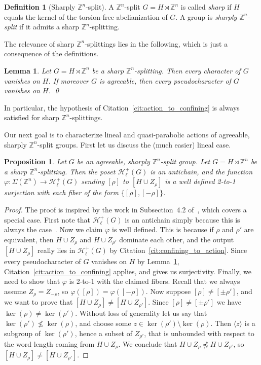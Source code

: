 \documentclass[10pt,a4paper]{article}
\newtheorem{prop}[cdrthm]{Proposition}
\newtheorem{lemm}[cdrthm]{Lemma}
\theoremstyle{definition}
\newtheorem{defi}[cdrthm]{Definition}
\theoremstyle{remark}
\newcommand{\Z}{\mathbb{Z}}
\newcommand{\Hyp}{\mathcal{H}}
\theoremstyle{plain}
\begin{document}
\begin{defi}[Sharply $\Z^n$-split]
    A $\Z^n$-split $G = H \rtimes \Z^n$ is called \emph{sharp} if $H$ equals the kernel of the torsion-free abelianization of $G$. A group is \emph{sharply $\Z^n$-split} if it admits a sharp $\Z^n$-splitting.
\end{defi}

The relevance of sharp $\Z^n$-splittings lies in the following, which is just a consequence of the definitions.

\begin{lemm}\label{lem:sharp}
Let $G = H \rtimes \Z^n$ be a sharp $\Z^n$-splitting. Then every character of $G$ vanishes on $H$. If moreover $G$ is agreeable, then every pseudocharacter of $G$ vanishes on $H$. \qed
\end{lemm}

In particular, the hypothesis of Citation~\ref{cit:action_to_confining} is always satisfied for sharp $\Z^n$-splittings.

Our next goal is to characterize lineal and quasi-parabolic actions of agreeable, sharply $\Z^n$-split groups. First let us discuss the (much easier) lineal case.

\begin{prop}\label{prop:lineal}
Let $G$ be an agreeable, sharply $\Z^n$-split group. Let $G=H\rtimes\Z^n$ be a sharp $\Z^n$-splitting. Then the poset $\Hyp_\ell^+(G)$ is an antichain, and the function $\varphi \colon \Sigma(\Z^n)\to \Hyp_\ell^+(G)$ sending $[\rho]$ to $[H\cup Z_\rho]$ is a well defined 2-to-1 surjection with each fiber of the form $\{[\rho],[-\rho]\}$.
\end{prop}

\begin{proof}
The proof is inspired by the work in Subsection~4.2 of~\cite{confining}, which covers a special case. First note that $\Hyp_\ell^+(G)$ is an antichain simply because this is always the case~\cite[Theorem~4.22(a)]{ABO}. Now we claim $\varphi$ is well defined. This is because if $\rho$ and $\rho'$ are equivalent, then $H\cup Z_\rho$ and $H\cup Z_{\rho'}$ dominate each other, and the output $[H\cup Z_\rho]$ really lies in $\Hyp_\ell^+(G)$ by Citation~\ref{cit:confining_to_action}. Since every pseudocharacter of $G$ vanishes on $H$ by Lemma~\ref{lem:sharp}, Citation~\ref{cit:action_to_confining} applies, and gives us surjectivity. Finally, we need to show that $\varphi$ is 2-to-1 with the claimed fibers. Recall that we always assume $Z_{\rho} = Z_{-\rho}$, so $\varphi([\rho])=\varphi([-\rho])$. Now suppose $[\rho]\ne[\pm\rho']$, and we want to prove that $[H\cup Z_\rho]\ne[H\cup Z_{\rho'}]$. Since $[\rho]\ne[\pm\rho']$ we have $\ker(\rho)\ne \ker(\rho')$. Without loss of generality let us say that $\ker(\rho')\not\le \ker(\rho)$, and choose some $z\in \ker(\rho')\setminus \ker(\rho)$. Then $\langle z\rangle$ is a subgroup of $\ker(\rho')$, hence a subset of $Z_{\rho'}$, that is unbounded with respect to the word length coming from $H\cup Z_\rho$. We conclude that $H\cup Z_\rho\not\preceq H\cup Z_{\rho'}$, so $[H\cup Z_\rho]\ne[H\cup Z_{\rho'}]$.
\end{proof}
\end{document}
